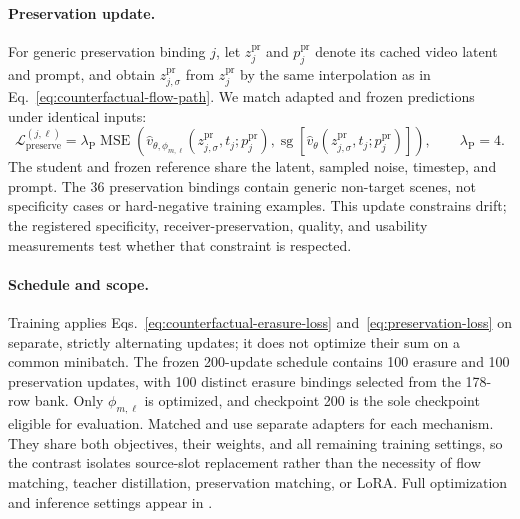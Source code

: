 \paragraph{Preservation update.}
For generic preservation binding \(j\), let \(z_j^{\mathrm{pr}}\) and
\(p_j^{\mathrm{pr}}\) denote its cached video latent and prompt, and obtain
\(z_{j,\sigma}^{\mathrm{pr}}\) from \(z_j^{\mathrm{pr}}\) by the same
interpolation as in Eq.~\eqref{eq:counterfactual-flow-path}. We match adapted
and frozen predictions under identical inputs:
\begin{equation}
  \mathcal{L}_{\mathrm{preserve}}^{(j,\ell)}
  =
  \lambda_{\mathrm P}
  \operatorname{MSE}\!\left(
    \widehat v_{\theta,\phi_{m,\ell}}
      (z_{j,\sigma}^{\mathrm{pr}},t_j;p_j^{\mathrm{pr}}),
    \operatorname{sg}\!\left[
      \widehat v_{\theta}
        (z_{j,\sigma}^{\mathrm{pr}},t_j;p_j^{\mathrm{pr}})
    \right]
  \right),
  \qquad \lambda_{\mathrm P}=4.
  \label{eq:preservation-loss}
\end{equation}
The student and frozen reference share the latent, sampled noise, timestep,
and prompt. The 36 preservation bindings contain generic non-target scenes,
not specificity cases or hard-negative training examples. This update
constrains drift; the registered specificity, receiver-preservation, quality,
and usability measurements test whether that constraint is respected.

\paragraph{Schedule and scope.}
Training applies Eqs.~\eqref{eq:counterfactual-erasure-loss}
and~\eqref{eq:preservation-loss} on separate, strictly alternating updates;
it does not optimize their sum on a common minibatch. The frozen 200-update
schedule contains 100 erasure and 100 preservation updates, with 100 distinct
erasure bindings selected from the 178-row bank. Only \(\phi_{m,\ell}\) is
optimized, and checkpoint 200 is the sole checkpoint eligible for evaluation.
Matched and \methodshort{} use separate adapters for each mechanism. They share both
objectives, their weights, and all remaining training settings, so the contrast
isolates source-slot replacement rather than the necessity of flow matching,
teacher distillation, preservation matching, or LoRA. Full optimization and
inference settings appear in .
